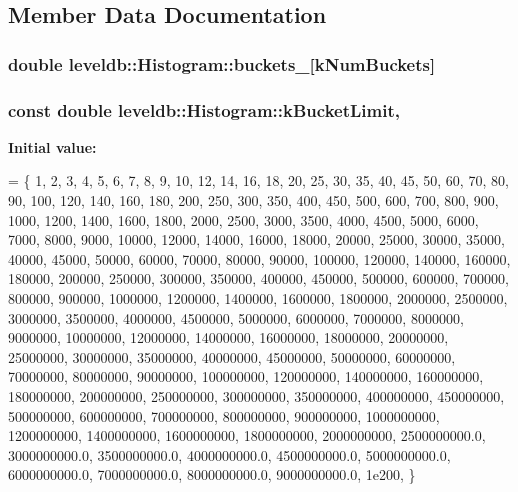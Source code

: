 \subsection{Member Data Documentation}
\hypertarget{classleveldb_1_1_histogram_a332d20f5b4811483f443a0fffde60a27}{
\subsubsection[{buckets\-\_\-}]{\setlength{\rightskip}{0pt plus 5cm}double leveldb\-::\-Histogram\-::buckets\-\_\-\mbox{[}{\bf k\-Num\-Buckets}\mbox{]}\hspace{0.3cm}{\ttfamily [private]}}}\label{classleveldb_1_1_histogram_a332d20f5b4811483f443a0fffde60a27}
\hypertarget{classleveldb_1_1_histogram_aaad18e83be993ecfe63a566869a9d3cc}{
\subsubsection[{k\-Bucket\-Limit}]{\setlength{\rightskip}{0pt plus 5cm}const double leveldb\-::\-Histogram\-::k\-Bucket\-Limit\hspace{0.3cm}{\ttfamily [static]}, {\ttfamily [private]}}}\label{classleveldb_1_1_histogram_aaad18e83be993ecfe63a566869a9d3cc}
{\bfseries Initial value\-:}
\begin{DoxyCode}
= \{
  1, 2, 3, 4, 5, 6, 7, 8, 9, 10, 12, 14, 16, 18, 20, 25, 30, 35, 40, 45,
  50, 60, 70, 80, 90, 100, 120, 140, 160, 180, 200, 250, 300, 350, 400, 450,
  500, 600, 700, 800, 900, 1000, 1200, 1400, 1600, 1800, 2000, 2500, 3000,
  3500, 4000, 4500, 5000, 6000, 7000, 8000, 9000, 10000, 12000, 14000,
  16000, 18000, 20000, 25000, 30000, 35000, 40000, 45000, 50000, 60000,
  70000, 80000, 90000, 100000, 120000, 140000, 160000, 180000, 200000,
  250000, 300000, 350000, 400000, 450000, 500000, 600000, 700000, 800000,
  900000, 1000000, 1200000, 1400000, 1600000, 1800000, 2000000, 2500000,
  3000000, 3500000, 4000000, 4500000, 5000000, 6000000, 7000000, 8000000,
  9000000, 10000000, 12000000, 14000000, 16000000, 18000000, 20000000,
  25000000, 30000000, 35000000, 40000000, 45000000, 50000000, 60000000,
  70000000, 80000000, 90000000, 100000000, 120000000, 140000000, 160000000,
  180000000, 200000000, 250000000, 300000000, 350000000, 400000000,
  450000000, 500000000, 600000000, 700000000, 800000000, 900000000,
  1000000000, 1200000000, 1400000000, 1600000000, 1800000000, 2000000000,
  2500000000.0, 3000000000.0, 3500000000.0, 4000000000.0, 4500000000.0,
  5000000000.0, 6000000000.0, 7000000000.0, 8000000000.0, 9000000000.0,
  1e200,
\}
\end{DoxyCode}
